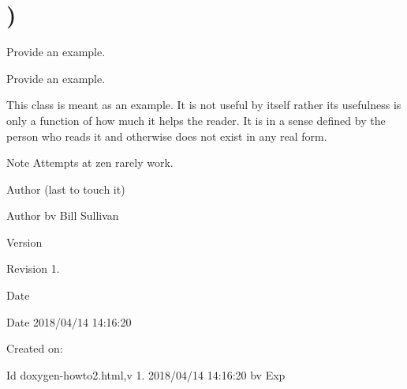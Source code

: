 \hypertarget{group__somewhere}{}\section{)}
\label{group__somewhere}


Provide an example.  


Provide an example. 

This class is meant as an example. It is not useful by itself rather its usefulness is only a function of how much it helps the reader. It is in a sense defined by the person who reads it and otherwise does not exist in any real form.

\begin{DoxyNote}{Note}
Attempts at zen rarely work.
\end{DoxyNote}
\begin{DoxyAuthor}{Author}
(last to touch it) 
\end{DoxyAuthor}
\begin{DoxyParagraph}{Author}
bv Bill Sullivan
\end{DoxyParagraph}


\begin{DoxyVersion}{Version}

\end{DoxyVersion}
\begin{DoxyParagraph}{Revision}
1. 
\end{DoxyParagraph}


\begin{DoxyDate}{Date}

\end{DoxyDate}
\begin{DoxyParagraph}{Date}
2018/04/14 14\+:16\+:20 
\end{DoxyParagraph}


Created on\+:

\begin{DoxyParagraph}{Id}
doxygen-\/howto2.\+html,v 1. 2018/04/14 14\+:16\+:20 bv Exp 
\end{DoxyParagraph}
